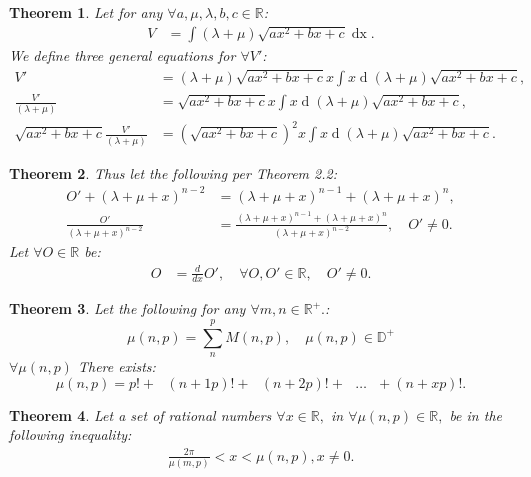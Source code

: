 \documentclass[10pt]{article}
\theoremstyle{plain}
\newtheorem{theorem}{Theorem}[section]
\theoremstyle{definition}
\theoremstyle{remark}
\begin{document}
\begin{theorem}
	Let for any $\forall a, \mu, \lambda, b, c \in \mathbb{R}$:
	\begin{align*}
		V &= \int (\lambda + \mu)\sqrt{ax^2 + bx  +c} \operatorname{dx}.
	\end{align*}
	We define three general equations for $\forall V'$:
	\begin{align*}
		V' &= (\lambda + \mu)\sqrt{ax^2 + bx  +c}x \int x \operatorname{d}(\lambda + \mu)\sqrt{ax^2 + bx  +c},\\
		\frac{V'}{(\lambda + \mu)} &= \sqrt{ax^2 + bx  +c}x \int x \operatorname{d}(\lambda + \mu)\sqrt{ax^2 + bx  +c},\\
		\sqrt{ax^2 + bx  +c}\frac{V'}{(\lambda + \mu)} &= (\sqrt{ax^2 + bx  +c})^{2}x \int x \operatorname{d}(\lambda + \mu)\sqrt{ax^2 + bx  +c}.
	\end{align*}
\end{theorem}

\begin{theorem}
	Thus let the following per Theorem 2.2:
	\begin{align*}
		O' + (\lambda + \mu + x)^{n-2} &= (\lambda + \mu + x)^{n-1} + (\lambda + \mu + x)^{n},\\
		\frac{O'}{(\lambda + \mu + x)^{n-2}} &= \frac{(\lambda + \mu + x)^{n-1} + (\lambda + \mu + x)^{n}}{(\lambda + \mu + x)^{n-2}}, \quad O' \neq 0.
	\end{align*}
	Let $\forall O \in \mathbb{R}$ be:
	\begin{align*}
		O &= \frac{d}{dx} O', \quad \forall O, O' \in \mathbb{R}, \quad O' \neq 0.
	\end{align*}
\end{theorem}

\begin{theorem}
	Let the following for any $\forall m, n \in \mathbb{R}^{+}.$:
\begin{equation}
    \mu(n, p) = \sum_{n}^{p} M(n, p), \quad \mu(n, p) \in \mathbb{D}^{+}
\end{equation}
$\forall \mu(n, p)$ There exists:
\begin{equation}
    \mu(n, p) = p! + \text{ } (n+1p)! + \text{ } (n+2p)! + \text{ } \dots \text{ } + (n+xp)!.
\end{equation}
\end{theorem}

\begin{theorem}
	Let a set of rational numbers $\forall x \in \mathbb{R},$ in $\forall \mu(n, p) \in \mathbb{R},$ be in the following inequality:
	\begin{align*}
		\frac{2\pi}{\mu(m, p)} < x < \mu(n, p), x \neq 0.
	\end{align*}
\end{theorem}
\end{document}
